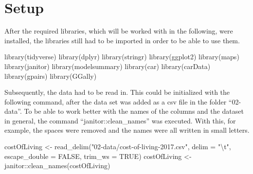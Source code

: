 \documentclass[
  11pt,
  a4paper,
  twoside]{scrbook}
\newenvironment{Shaded}{\begin{snugshade}}{\end{snugshade}}
\newcommand{\AttributeTok}[1]{\textcolor[rgb]{0.77,0.63,0.00}{#1}}
\newcommand{\ConstantTok}[1]{\textcolor[rgb]{0.00,0.00,0.00}{#1}}
\newcommand{\FunctionTok}[1]{\textcolor[rgb]{0.00,0.00,0.00}{#1}}
\newcommand{\NormalTok}[1]{#1}
\newcommand{\OtherTok}[1]{\textcolor[rgb]{0.56,0.35,0.01}{#1}}
\newcommand{\SpecialCharTok}[1]{\textcolor[rgb]{0.00,0.00,0.00}{#1}}
\newcommand{\StringTok}[1]{\textcolor[rgb]{0.31,0.60,0.02}{#1}}
\begin{document}
\hypertarget{setup}{%
\section{Setup}\label{setup}}

After the required libraries, which will be worked with in the following, were installed, the libraries still had to be imported in order to be able to use them.

\linespread{1}

\begin{Shaded}
\begin{Highlighting}[]
\FunctionTok{library}\NormalTok{(tidyverse)}
\FunctionTok{library}\NormalTok{(dplyr)}
\FunctionTok{library}\NormalTok{(stringr)}
\FunctionTok{library}\NormalTok{(ggplot2)}
\FunctionTok{library}\NormalTok{(maps)}
\FunctionTok{library}\NormalTok{(janitor)}
\FunctionTok{library}\NormalTok{(modelsummary)}
\FunctionTok{library}\NormalTok{(car)}
\FunctionTok{library}\NormalTok{(carData)}
\FunctionTok{library}\NormalTok{(gpairs)}
\FunctionTok{library}\NormalTok{(GGally)}
\end{Highlighting}
\end{Shaded}

\linespread{1}

Subsequently, the data had to be read in. This could be initialized with the following command, after the data set was added as a csv file in the folder ``02-data''.
To be able to work better with the names of the columns and the dataset in general, the command ``janitor::clean\_names'' was executed. With this, for example, the spaces were removed and the names were all written in small letters.

\linespread{1}

\begin{Shaded}
\begin{Highlighting}[]
\NormalTok{costOfLiving }\OtherTok{\textless{}{-}} \FunctionTok{read\_delim}\NormalTok{(}\StringTok{"02{-}data/cost{-}of{-}living{-}2017.csv"}\NormalTok{, }
                      \AttributeTok{delim =} \StringTok{"}\SpecialCharTok{\textbackslash{}t}\StringTok{"}\NormalTok{, }\AttributeTok{escape\_double =} \ConstantTok{FALSE}\NormalTok{, }
                      \AttributeTok{trim\_ws =} \ConstantTok{TRUE}\NormalTok{)}
\NormalTok{costOfLiving }\OtherTok{\textless{}{-}}\NormalTok{ janitor}\SpecialCharTok{::}\FunctionTok{clean\_names}\NormalTok{(costOfLiving)}
\end{Highlighting}
\end{Shaded}
\end{document}
